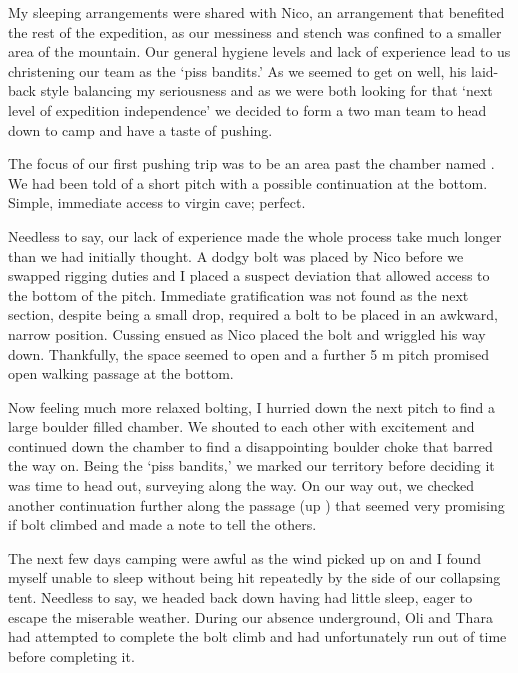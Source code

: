 My sleeping arrangements were shared with Nico, an arrangement that
benefited the rest of the expedition, as our messiness and stench was
confined to a smaller area of the mountain. Our general hygiene levels
and lack of experience lead to us christening our team as the `piss
bandits.' As we seemed to get on well, his laid-back style balancing my
seriousness and as we were both looking for that `next level of
expedition independence' we decided to form a two man team to head down
to camp and have a taste of pushing.

The focus of our first pushing trip was to be an area past the 
chamber named . We had been told of a short pitch with a
possible continuation at the bottom. Simple, immediate access to virgin
cave; perfect.

Needless to say, our lack of experience made the whole process take much
longer than we had initially thought. A dodgy bolt was placed by Nico
before we swapped rigging duties and I placed a suspect deviation that
allowed access to the bottom of the pitch. Immediate gratification was
not found as the next section, despite being a small drop, required a
bolt to be placed in an awkward, narrow position. Cussing ensued as Nico
placed the bolt and wriggled his way down. Thankfully, the space seemed
to open and a further 5 m pitch promised open walking passage at the
bottom.


Now feeling much more relaxed bolting, I hurried down the next pitch to
find a large boulder filled chamber. We shouted to each other with
excitement and continued down the chamber to find a disappointing
boulder choke that barred the way on. Being the `piss bandits,' we
marked our territory before deciding it was time to head out, surveying
along the way. On our way out, we checked another continuation further
along the  passage (up ) that seemed very promising
if bolt climbed and made a note to tell the others.


The next few days camping were awful as the wind picked up on 
and I found myself unable to sleep without being hit repeatedly by the
side of our collapsing tent. Needless to say, we headed back down having
had little sleep, eager to escape the miserable weather. During our
absence underground, Oli and Thara had attempted to complete the bolt
climb and had unfortunately run out of time before completing it.


